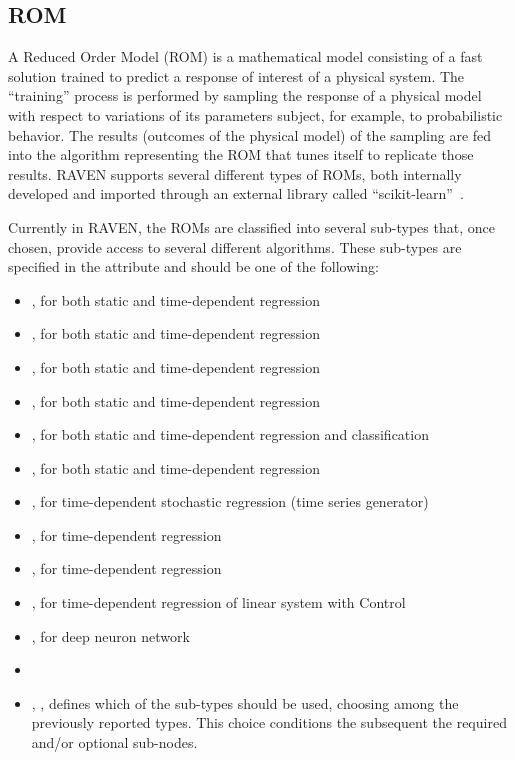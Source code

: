 \subsection{ROM}
\label{subsec:models_ROM}
A Reduced Order Model (ROM) is a mathematical model consisting of a fast
solution trained to predict a response of interest of a physical system.
%
The ``training'' process is performed by sampling the response of a physical
model with respect to variations of its parameters subject, for example, to
probabilistic behavior.
%
The results (outcomes of the physical model) of the sampling are fed into the
algorithm representing the ROM that tunes itself to replicate those results.
%
RAVEN supports several different types of ROMs, both internally developed and
imported through an external library called ``scikit-learn''~\cite{SciKitLearn}.

Currently in RAVEN, the ROMs are classified into several sub-types that, once chosen,
provide access to several different algorithms.
%
These sub-types are specified in the  attribute and should be
one of the following:
\begin{itemize}
  \item {}, for both static and time-dependent regression
  \item {}, for both static and time-dependent regression
  \item {}, for both static and time-dependent regression
  \item {}, for both static and time-dependent regression
  \item {}, for both static and time-dependent regression and classification
  \item {}, for both static and time-dependent regression
  \item {}, for time-dependent stochastic regression (time series generator)
  \item {}, for time-dependent regression
  \item {}, for time-dependent regression
  \item {}, for time-dependent regression of linear system with Control
  \item {}, for deep neuron network
\end{itemize}

%
\attrsIntro
%
\vspace{-5mm}
\begin{itemize}
  \itemsep0em
  \item \nameDescription
  \item {}, , defines which of
  the sub-types should be used, choosing among the previously reported
  types.
  This choice conditions the subsequent the required and/or optional
   sub-nodes.
\end{itemize}
\vspace{-5mm}

